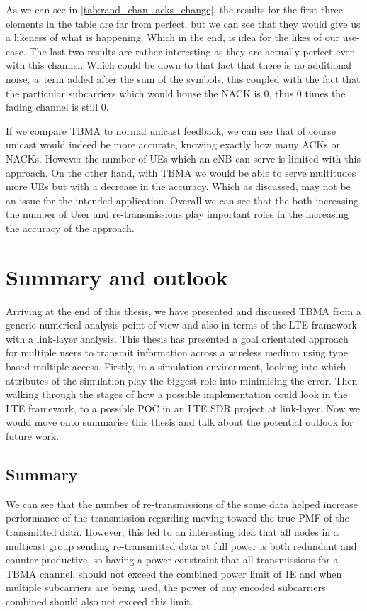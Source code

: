 \documentclass{article}
\begin{document}
As we can see in \cref{tab:rand_chan_acks_change}, the results for the first three elements in the table are far from perfect, but we can see that they would give us a likeness of what is happening. Which in the end, is idea for the likes of our use-case. The last two results are rather interesting as they are actually perfect even with this channel. Which could be down to that fact that there is no additional noise, $w$ term added after the sum of the symbols, this coupled with the fact that the particular subcarriers which would house the NACK is 0, thus 0 times the fading channel is still 0. 

If we compare \ac{TBMA} to normal unicast feedback, we can see that of course unicast would indeed be more accurate, knowing exactly how many ACKs or NACKs. However the number of UEs which an \ac{eNB} can serve is limited with this approach. On the other hand, with TBMA we would be able to serve multitudes more UEs but with a decrease in the accuracy. Which as discussed, may not be an issue for the intended application. Overall we can see that the both increasing the number of User and re-transmissions play important roles in the increasing the accuracy of the approach.

\newpage
\section{Summary and outlook}\label{summary_out}
Arriving at the end of this thesis, we have presented and discussed \ac{TBMA} from a generic numerical analysis point of view and also in terms of the LTE framework with a link-layer analysis. This thesis has presented a goal orientated approach for multiple users to transmit information across a wireless medium using type based multiple access. Firstly, in a simulation environment, looking into which attributes of the simulation play the biggest role into minimising the error. Then walking through the stages of how a possible implementation could look in the LTE framework, to a possible \ac{POC} in an LTE \ac{SDR} project at link-layer. Now we would move onto summarise this thesis and talk about the potential outlook for future work. 

\subsection{Summary}
We can see that the number of re-transmissions of the same data helped increase performance of the transmission regarding moving toward the true \ac{PMF} of the transmitted data. However, this led to an interesting idea that all nodes in a multicast group sending re-transmitted data at full power is both redundant and counter productive, so having a power constraint that all transmissions for a TBMA channel, should not exceed the combined power limit of 1E and when multiple subcarriers are being used, the power of any encoded subcarriers combined should also not exceed this limit.
\end{document}
